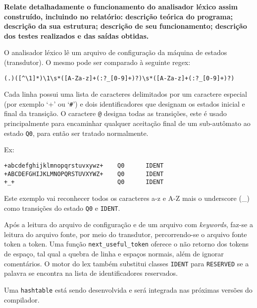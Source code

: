 
\textbf{Relate detalhadamente o funcionamento do analisador léxico assim construído, incluindo no relatório: descrição teórica do programa; descrição da sua estrutura; descrição de seu funcionamento; descrição dos testes realizados e das saídas obtidas.}

O analisador léxico lê um arquivo de configuração da máquina de estados
(transdutor). O mesmo pode ser comparado à seguinte regex:

\verb!(.)([^\1]*)\1\s*([A-Za-z]+(:?_[0-9]+)?)\s*([A-Za-z]+(:?_[0-9]+)?)!

Cada linha possui uma lista de caracteres delimitados por um caractere
especial (por exemplo `+' ou `\verb!#!') e dois identificadores que designam os
estados inicial e final da transição. O caractere \verb!@! designa todas as
transições, este é usado principalmente para encaminhar qualquer aceitação
final de um sub-autômato ao estado \verb!Q0!, para então ser tratado
normalmente.

Ex:
\begin{lstlisting}
+abcdefghijklmnopqrstuvxywz+    Q0      IDENT
+ABCDEFGHIJKLMNOPQRSTUVXYWZ+    Q0      IDENT
+_+                             Q0      IDENT
\end{lstlisting}
Este exemplo vai reconhecer todos os caracteres a-z e A-Z mais o underscore
(\_) como transições do estado \verb!Q0! e \verb!IDENT!.

Após a leitura do arquivo de configuração e de um arquivo com
    \emph{keywords}, faz-se a leitura do arquivo fonte, por meio do
transdutor, percorrendo-se o arquivo fonte token a token. Uma função
\verb!next_useful_token! oferece o não retorno dos tokens de espaço, tal qual a
quebra de linha e espaços normais, além de ignorar comentários. O motor do lex também substitui classes
\verb!IDENT! para \verb!RESERVED! se a palavra se encontra na lista de
identificadores reservados. 

Uma \verb+hashtable+ está sendo desenvolvida e será integrada nas próximas versões do
compilador.
